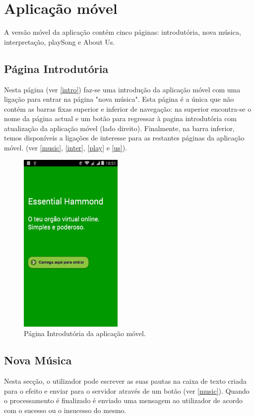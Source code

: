 \section{Aplicação móvel}
A versão móvel da aplicação contém cinco páginas: introdutória, nova música, interpretação, playSong e About Us.

\subsection{Página Introdutória}
Nesta página (ver \autoref{intro}) faz-se uma introdução da aplicação móvel com uma ligação para entrar na página "nova música". Esta página é a única que não contém as barras fixas superior e inferior de navegação: na superior encontra-se o nome da página actual e um botão para regressar à pagina introdutória com atualização da aplicação móvel (lado direito). Finalmente, na barra inferior, temos disponíveis a ligações de interesse para as restantes páginas da aplicação móvel. (ver \autoref{music}, \autoref{inter}, \autoref{play} e \autoref{us}).

\begin{figure}[htp]
\centering
\includegraphics[width=50mm]{images/appIntro.jpg}
\caption{Página Introdutória da aplicação móvel.}
\label{intro}
\end{figure}

\subsection{Nova Música}
Nesta secção, o utilizador pode escrever as suas pautas na caixa de texto criada para o efeito e enviar para o servidor através de um botão (ver \autoref{music}). Quando o processamento é finalizado é enviado uma mensagem ao utilizador de acordo com o sucesso ou o insucesso do mesmo. 

